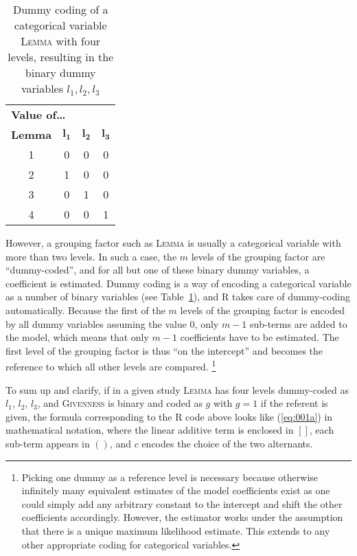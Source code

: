 \begin{table}
  \centering
  \begin{tabular}{cccc}
    \toprule
    \multicolumn{4}{l}{\textbf{Value of\ldots}} \\
    \textbf{Lemma} & $\mathbf{l_1}$ & $\mathbf{l_2}$ & $\mathbf{l_3}$ \\
    \midrule
    1 & 0 & 0 & 0 \\ 
    2 & 1 & 0 & 0 \\ 
    3 & 0 & 1 & 0 \\ 
    4 & 0 & 0 & 1 \\ 
    \bottomrule
  \end{tabular}
  \caption{Dummy coding of a categorical variable \textsc{Lemma} with four levels, resulting in the binary dummy variables $l_1,l_2,l_3$}
  \label{tab:dummy}
\end{table}

However, a grouping factor such as \textsc{Lemma} is usually a categorical variable with more than two levels.
In such a case, the $m$ levels of the grouping factor are ``dummy-coded'', and for all but one of these binary dummy variables, a coefficient is estimated.
Dummy coding is a way of encoding a categorical variable as a number of binary variables (see Table~\ref{tab:dummy}), and R takes care of dummy-coding automatically.
Because the first of the $m$ levels of the grouping factor is encoded by all dummy variables assuming the value 0, only $m-1$ sub-terms are added to the model, which means that only $m-1$ coefficients have to be estimated.
The first level of the grouping factor is thus ``on the intercept'' and becomes the reference to which all other levels are compared.%
\footnote{Picking one dummy as a reference level is necessary because otherwise infinitely many equivalent estimates of the model coefficients exist as one could simply add any arbitrary constant to the intercept and shift the other coefficients accordingly.
However, the estimator works under the assumption that there is a unique maximum likelihood estimate.
This extends to any other appropriate coding for categorical variables.
}

To sum up and clarify, if in a given study \textsc{Lemma} has four levels dummy-coded as $l_1$, $l_2$, $l_3$, and \textsc{Givenness} is binary and coded as $g$ with $g=1$ if the referent is given, the formula corresponding to the R code above looks like (\ref{eq:001a}) in mathematical notation, where the linear additive term is enclosed in $[ ]$, each sub-term appears in $( )$, and $c$ encodes the choice of the two alternants.

